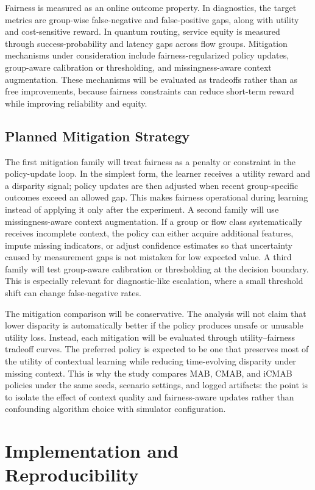 \documentclass[conference]{IEEEtran}
\begin{document}
Fairness is measured as an online outcome property. In diagnostics, the target
metrics are group-wise false-negative and false-positive gaps, along with
utility and cost-sensitive reward. In quantum routing, service equity is
measured through success-probability and latency gaps across flow groups.
Mitigation mechanisms under consideration include fairness-regularized policy
updates, group-aware calibration or thresholding, and missingness-aware
context augmentation. These mechanisms will be evaluated as tradeoffs rather
than as free improvements, because fairness constraints can reduce short-term
reward while improving reliability and equity.

\subsection{Planned Mitigation Strategy}
The first mitigation family will treat fairness as a penalty or constraint in
the policy-update loop. In the simplest form, the learner receives a utility
reward and a disparity signal; policy updates are then adjusted when recent
group-specific outcomes exceed an allowed gap. This makes fairness operational
during learning instead of applying it only after the experiment. A second
family will use missingness-aware context augmentation. If a group or flow class
systematically receives incomplete context, the policy can either acquire
additional features, impute missing indicators, or adjust confidence estimates
so that uncertainty caused by measurement gaps is not mistaken for low expected
value. A third family will test group-aware calibration or thresholding at the
decision boundary. This is especially relevant for diagnostic-like escalation,
where a small threshold shift can change false-negative rates.

The mitigation comparison will be conservative. The analysis will not claim
that lower disparity is automatically better if the policy produces unsafe or
unusable utility loss. Instead, each mitigation will be evaluated through
utility--fairness tradeoff curves. The preferred policy is expected to be one
that preserves most of the utility of contextual learning while reducing
time-evolving disparity under missing context. This is why the study compares
MAB, CMAB, and iCMAB policies under the same seeds, scenario settings, and
logged artifacts: the point is to isolate the effect of context quality and
fairness-aware updates rather than confounding algorithm choice with simulator
configuration.

\section{Implementation and Reproducibility}
\end{document}
